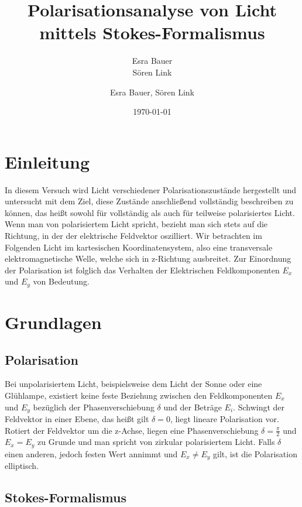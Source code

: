 \documentclass[bigchapter,colorback,accentcolor=tud4b,linedtoc,11pt]{tudreport}
\title{Polarisationsanalyse von Licht mittels Stokes-Formalismus}
\subtitle{Esra Bauer  \\Sören Link}
\author{Esra Bauer, Sören Link}
\date{\today}
\begin{document}

\maketitle

\tableofcontents


\chapter{Einleitung}

In diesem Versuch wird Licht verschiedener Polarisationszustände hergestellt und untersucht mit dem Ziel, diese Zustände anschließend vollständig beschreiben zu können, das heißt sowohl für vollständig als auch für teilweise polarisiertes Licht. Wenn man von polarisiertem Licht spricht, bezieht man sich stets auf die Richtung, in der der elektrische Feldvektor oszilliert. Wir betrachten im Folgenden Licht im kartesischen Koordinatensystem, also eine transversale elektromagnetische Welle, welche sich in z-Richtung ausbreitet. Zur Einordnung der Polarisation ist folglich das Verhalten der Elektrischen Feldkomponenten $E_x$ und $E_y$ von Bedeutung.

\chapter{Grundlagen}
\section{Polarisation}


Bei unpolarisiertem Licht, beispielsweise dem Licht der Sonne oder eine Glühlampe, existiert keine feste Beziehung zwischen den Feldkomponenten $E_x$ und $E_y$ bezüglich der Phasenverschiebung $\delta$ und der Beträge $E_{i}$. Schwingt der Feldvektor in einer Ebene, das heißt gilt $\delta=0$, liegt lineare Polarisation vor. Rotiert der Feldvektor um die z-Achse, liegen eine Phasenverschiebung $\delta=\frac{\pi}{2}$ und $E_{x}=E_{y}$ zu Grunde und man spricht von zirkular polarisiertem Licht. Falls $\delta$ einen anderen, jedoch festen Wert annimmt und $E_{x}\neq E_{y}$ gilt, ist die Polarisation elliptisch. 


\section{Stokes-Formalismus}
\end{document}
